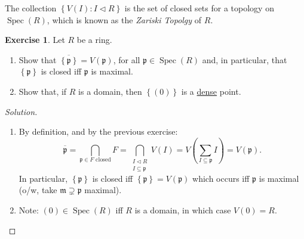 \documentclass[12pt, draft,reqno,a4paper, twoside]{beamer}
\theoremstyle{plain}
\theoremstyle{definition}
\newtheorem{exer}{Exercise}
\DeclareMathOperator{\spec}{Spec}
\newcommand{\fp}{\mathfrak{p}}
\newcommand{\set}[1]{\left\{{#1}\right\}}
\newcommand{\mfr}{\mathfrak}
\newcommand{\normal}{\triangleleft}
\begin{document}
\begin{frame}
The collection $\set{V(I):I\normal R}$ is the set of closed sets for a topology on $\spec(R)$, which is known as the \textit{Zariski Topolgy }of $R$. 
\end{frame}
\begin{frame}
	\begin{exer}
		Let $R$ be a ring.
		\begin{enumerate}
			\item Show that $\overline{\set{\fp}}=V(\fp)$, for all $\fp\in\spec(R)$ and, in particular, that $\set{\fp}$ is closed iff $\fp$ is maximal.
			\item Show that, if $R$ is a domain, then $\set{(0)}$ is a \underline{dense} point. 
		\end{enumerate}
	\end{exer}
\begin{proof}[Solution]
	\begin{enumerate}
		\item<3-> By definition, and by the previous exercise:\[\overline{\fp}=\bigcap_{\fp\in F\text{ closed}} F=\bigcap_{\substack{I\normal R\\ I\subseteq \fp}}V(I)=V(\sum_{I\subseteq\fp} I)=V(\fp).\]
		In particular, $\set{\fp}$ is closed iff $\set{\fp}=V(\fp)$ which occurs iff $\fp$ is maximal (o/w, take $\mfr{m}\supsetneq \fp$ maximal).
		\item<4-> Note: $(0)\in\spec(R)$ iff $R$ is a domain, in which case $V(0)=R$. 
	\end{enumerate}
\end{proof}
\end{frame}
\begin{frame}
\end{frame}
\end{document}
